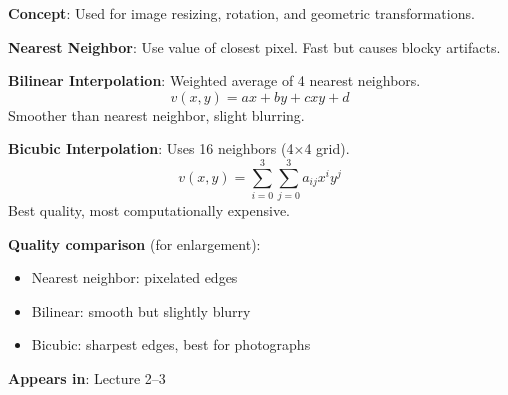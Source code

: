 \documentclass[10pt]{article}
\begin{document}
\begin{conceptbox}

\textbf{Concept}: Used for image resizing, rotation, and geometric transformations.

\begin{formulabox}
\textbf{Nearest Neighbor}: Use value of closest pixel. Fast but causes blocky artifacts.

\textbf{Bilinear Interpolation}: Weighted average of 4 nearest neighbors.
\[
v(x,y) = ax + by + cxy + d
\]
Smoother than nearest neighbor, slight blurring.

\textbf{Bicubic Interpolation}: Uses 16 neighbors (4$\times$4 grid).
\[
v(x,y) = \sum_{i=0}^{3}\sum_{j=0}^{3} a_{ij} x^i y^j
\]
Best quality, most computationally expensive.
\end{formulabox}

\begin{examplebox}
\textbf{Quality comparison} (for enlargement):
\begin{itemize}[leftmargin=1.5em, itemsep=0pt, topsep=2pt]
    \item Nearest neighbor: pixelated edges
    \item Bilinear: smooth but slightly blurry
    \item Bicubic: sharpest edges, best for photographs
\end{itemize}
\end{examplebox}

\textbf{Appears in}: Lecture 2--3

\end{conceptbox}

\end{document}
